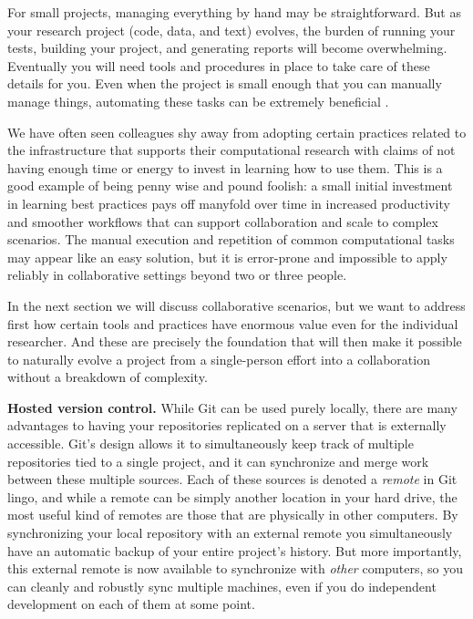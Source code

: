 \documentclass[11pt,oneside,english]{article}
\newcommand{\blockpar}[1]{\vspace*{3mm} \noindent \textbf{#1}}
\begin{document}
For small projects, managing everything by hand may be straightforward.
But as your research project (code, data, and text) evolves, the burden of
running your tests, building your project, and generating reports will become
overwhelming. Eventually you will need tools and procedures in place to take
care of these details for you. Even when the project is small enough that you
can manually manage things, automating these tasks can be extremely beneficial
\cite{doar2005practical}.

We have often seen colleagues shy away from adopting certain practices related
to the infrastructure that supports their computational research with claims of
not having enough time or energy to invest in learning how to use them.  This
is a good example of being penny wise and pound foolish: a small initial
investment in learning best practices pays off manyfold over time in increased
productivity and smoother workflows that can support collaboration and scale to
complex scenarios.  The manual execution and repetition of common computational
tasks may appear like an easy solution, but it is error-prone and impossible to
apply reliably in collaborative settings beyond two or three people.

In the next section we will discuss collaborative scenarios, but we want to
address first how certain tools and practices have enormous value even for the
individual researcher.  And these are precisely the foundation that will then
make it possible to naturally evolve a project from a single-person effort into
a collaboration without a breakdown of complexity.

\blockpar{Hosted version control.}  While Git can be used purely locally, there
are many advantages to having your repositories replicated on a server that is
externally accessible.  Git's design allows it to simultaneously keep track of
multiple repositories tied to a single project, and it can synchronize and
merge work between these multiple sources.  Each of these sources is denoted a
\emph{remote} in Git lingo, and while a remote can be simply another location
in your hard drive, the most useful kind of remotes are those that are
physically in other computers.  By synchronizing your local repository with an
external remote you simultaneously have an automatic backup of your entire
project's history.  But more importantly, this external remote is now available
to synchronize with \emph{other} computers, so you can cleanly and robustly
sync multiple machines, even if you do independent development on each of them
at some point.
\end{document}
